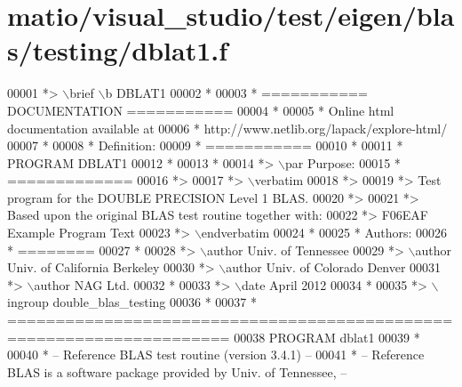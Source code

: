\hypertarget{matio_2visual__studio_2test_2eigen_2blas_2testing_2dblat1_8f_source}{}\section{matio/visual\+\_\+studio/test/eigen/blas/testing/dblat1.f}
\label{matio_2visual__studio_2test_2eigen_2blas_2testing_2dblat1_8f_source}

\begin{DoxyCode}
00001 \textcolor{comment}{*> \(\backslash\)brief \(\backslash\)b DBLAT1}
00002 \textcolor{comment}{*}
00003 \textcolor{comment}{*  =========== DOCUMENTATION ===========}
00004 \textcolor{comment}{*}
00005 \textcolor{comment}{* Online html documentation available at }
00006 \textcolor{comment}{*            http://www.netlib.org/lapack/explore-html/ }
00007 \textcolor{comment}{*}
00008 \textcolor{comment}{*  Definition:}
00009 \textcolor{comment}{*  ===========}
00010 \textcolor{comment}{*}
00011 \textcolor{comment}{*       PROGRAM DBLAT1}
00012 \textcolor{comment}{* }
00013 \textcolor{comment}{*}
00014 \textcolor{comment}{*> \(\backslash\)par Purpose:}
00015 \textcolor{comment}{*  =============}
00016 \textcolor{comment}{*>}
00017 \textcolor{comment}{*> \(\backslash\)verbatim}
00018 \textcolor{comment}{*>}
00019 \textcolor{comment}{*>    Test program for the DOUBLE PRECISION Level 1 BLAS.}
00020 \textcolor{comment}{*>}
00021 \textcolor{comment}{*>    Based upon the original BLAS test routine together with:}
00022 \textcolor{comment}{*>    F06EAF Example Program Text}
00023 \textcolor{comment}{*> \(\backslash\)endverbatim}
00024 \textcolor{comment}{*}
00025 \textcolor{comment}{*  Authors:}
00026 \textcolor{comment}{*  ========}
00027 \textcolor{comment}{*}
00028 \textcolor{comment}{*> \(\backslash\)author Univ. of Tennessee }
00029 \textcolor{comment}{*> \(\backslash\)author Univ. of California Berkeley }
00030 \textcolor{comment}{*> \(\backslash\)author Univ. of Colorado Denver }
00031 \textcolor{comment}{*> \(\backslash\)author NAG Ltd. }
00032 \textcolor{comment}{*}
00033 \textcolor{comment}{*> \(\backslash\)date April 2012}
00034 \textcolor{comment}{*}
00035 \textcolor{comment}{*> \(\backslash\)ingroup double\_blas\_testing}
00036 \textcolor{comment}{*}
00037 \textcolor{comment}{*  =====================================================================}
00038       \textcolor{keyword}{PROGRAM} dblat1
00039 \textcolor{comment}{*}
00040 \textcolor{comment}{*  -- Reference BLAS test routine (version 3.4.1) --}
00041 \textcolor{comment}{*  -- Reference BLAS is a software package provided by Univ. of Tennessee,    --}

\end{DoxyCode}
